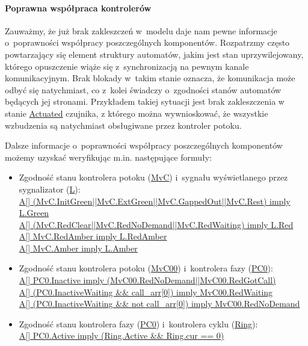 \documentclass{pracamgr}
\theoremstyle{plain}
\begin{document}
\paragraph{Poprawna współpraca kontrolerów}
Zauważmy, że już brak zakleszczeń w~modelu daje nam pewne informacje
o~poprawności współpracy poszczególnych komponentów. Rozpatrzmy często
powtarzający się element struktury automatów, jakim jest stan uprzywilejowany,
którego opuszczenie wiąże się z~synchronizacją na pewnym kanale
komunikacyjnym. Brak blokady w~takim stanie oznacza, że
komunikacja może odbyć się natychmiast, co z~kolei świadczy
o~zgodności stanów automatów będących jej stronami. Przykładem takiej
sytuacji jest brak zakleszczenia w stanie \url{Actuated} czujnika,
z którego można wywnioskować, że wszystkie wzbudzenia są natychmiast obsługiwane
przez kontroler potoku.

Dalsze informacje o~poprawności współpracy poszczególnych komponentów
możemy uzyskać weryfikując m.in. następujące formuły:

\begin{itemize}
  \item Zgodność stanu kontrolera potoku (\url{MvC}) i~sygnału
  wyświetlanego przez sygnalizator (\url{L}):\\
  \url{A[] (MvC.InitGreen||MvC.ExtGreen||MvC.GappedOut||MvC.Rest) imply L.Green}\\
  \url{A[] (MvC.RedClear||MvC.RedNoDemand||MvC.RedWaiting) imply L.Red}\\
  \url{A[] MvC.RedAmber imply L.RedAmber}\\
  \url{A[] MvC.Amber imply L.Amber}
  \item Zgodność stanu kontrolera potoku (\url{MvC00}) i~kontrolera
  fazy (\url{PC0}):\\
  \url{A[] PC0.Inactive imply (MvC00.RedNoDemand||MvC00.RedGotCall)}\\
  \url{A[] (PC0.InactiveWaiting && call_arr[0]) imply MvC00.RedWaiting}\\
  \url{A[] (PC0.InactiveWaiting && not call_arr[0]) imply MvC00.RedNoDemand}
  \item Zgodność stanu kontrolera fazy (\url{PC0}) i~kontrolera cyklu
  (\url{Ring}): \\
  \url{A[] PC0.Active imply (Ring.Active && Ring.cur == 0)}
\end{itemize}
\end{document}
